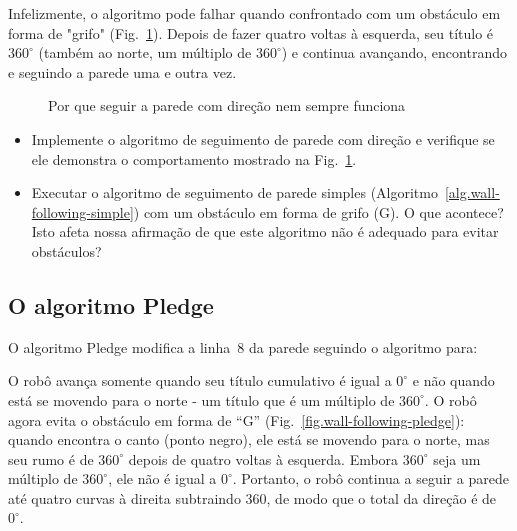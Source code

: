 Infelizmente, o algoritmo pode falhar quando confrontado com um obstáculo em forma de "grifo" (Fig.~\ref{fig.wall-direction-bug}). Depois de fazer quatro voltas à esquerda, seu título é $360^\circ$ (também ao norte, um múltiplo de $360^\circ$) e continua avançando, encontrando e seguindo a parede uma e outra vez.

\begin{figure}
\begin{center}
\caption{Por que seguir a parede com direção nem sempre funciona}\label{fig.wall-direction-bug}
\end{center}
\end{figure}

\begin{framed}
\begin{itemize}
\item Implemente o algoritmo de seguimento de parede com direção e verifique se ele demonstra o comportamento mostrado na Fig.~\ref{fig.wall-direction-bug}.
\item Executar o algoritmo de seguimento de parede simples (Algoritmo~\ref{alg.wall-following-simple}) com um obstáculo em forma de grifo (G). O que acontece? Isto afeta nossa afirmação de que este algoritmo não é adequado para evitar obstáculos?
\end{itemize}
\end{framed}

\subsection{O algoritmo Pledge}

O algoritmo Pledge modifica a linha~8 da parede seguindo o algoritmo para:
\begin{quote}
\normalsize {}
\end{quote}
O robô avança somente quando seu título cumulativo é igual a $0^\circ$ e não quando está se movendo para o norte - um título que é um múltiplo de $360^\circ$. O robô agora evita o obstáculo em forma de ``G'' (Fig.~\ref{fig.wall-following-pledge}): quando encontra o canto (ponto negro), ele está se movendo para o norte, mas seu rumo é de $360^\circ$ depois de quatro voltas à esquerda. Embora $360^\circ$ seja um múltiplo de $360^\circ$, ele não é igual a $0^\circ$. Portanto, o robô continua a seguir a parede até quatro curvas à direita subtraindo $360$, de modo que o total da direção é de $0^\circ$.


